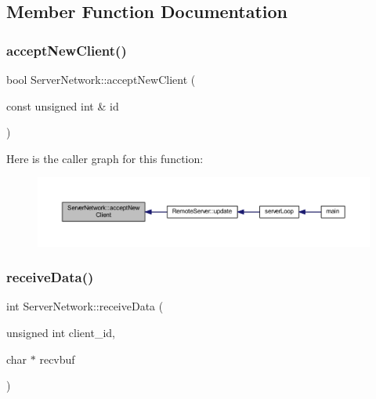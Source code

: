 \subsection{Member Function Documentation}
\mbox{\label{class_server_network_a88e6b758f3c4272463aac8c10908b036}} 
\subsubsection{\texorpdfstring{accept\+New\+Client()}{acceptNewClient()}}
{\footnotesize\ttfamily bool Server\+Network\+::accept\+New\+Client (\begin{DoxyParamCaption}\item[{const unsigned int \&}]{id }\end{DoxyParamCaption})}

Here is the caller graph for this function\+:
\nopagebreak
\begin{figure}[H]
\begin{center}
\leavevmode
\includegraphics[width=350pt]{class_server_network_a88e6b758f3c4272463aac8c10908b036_icgraph}
\end{center}
\end{figure}
\mbox{\label{class_server_network_a51b2272cbdf4f723c105ed08384772da}} 
\subsubsection{\texorpdfstring{receive\+Data()}{receiveData()}}
{\footnotesize\ttfamily int Server\+Network\+::receive\+Data (\begin{DoxyParamCaption}\item[{unsigned int}]{client\+\_\+id,  }\item[{char $\ast$}]{recvbuf }\end{DoxyParamCaption})}

